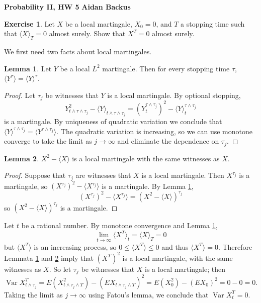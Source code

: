 \documentclass[10pt]{article}
\DeclareMathOperator{\Var}{Var}
\theoremstyle{definition}
\newtheorem{exer}{Exercise}
\newtheorem{lemma}{Lemma}[exer]
\begin{document}
\noindent
\large\textbf{Probability II, HW 5} \hfill \textbf{Aidan Backus} \\

\begin{exer}
Let $X$ be a local martingale, $X_0 = 0$, and $T$ a stopping time such that $\langle X\rangle_T = 0$ almost surely.
Show that $X^T = 0$ almost surely.
\end{exer}

We first need two facts about local martingales.

\begin{lemma}
\label{stopping time of quadratic variation}
Let $Y$ be a local $L^2$ martingale. Then for every stopping time $\tau$, $\langle Y^\tau \rangle = \langle Y \rangle^\tau$.
\end{lemma}
\begin{proof}
Let $\tau_j$ be witnesses that $Y$ is a local martingale.
By optional stopping,
$$Y^2_{t \wedge \tau \wedge \tau_j} - \langle Y\rangle_{t \wedge \tau \wedge \tau_j} = (Y^{\tau \wedge \tau_j}_t)^2 - \langle Y\rangle_t^{\tau \wedge \tau_j}$$
is a martingale. By uniqueness of quadratic variation we conclude that $\langle Y\rangle^{\tau \wedge \tau_j} = \langle Y^{\tau \wedge \tau_j}\rangle$.
The quadratic variation is increasing, so we can use monotone converge to take the limit as $j \to \infty$ and eliminate the dependence on $\tau_j$.
\end{proof}

\begin{lemma}
\label{local quadratic variation}
$X^2 - \langle X\rangle$ is a local martingale with the same witnesses as $X$.
\end{lemma}
\begin{proof}
Suppose that $\tau_j$ are witnesses that $X$ is a local martingale.
Then $X^{\tau_j}$ is a martingale, so $(X^{\tau_j})^2 - \langle X^{\tau_j}\rangle$ is a martingale.
By Lemma \ref{stopping time of quadratic variation},
$$(X^{\tau_j})^2 - \langle X^{\tau_j} \rangle = (X^2 - \langle X\rangle)^{\tau_j}$$
so $(X^2 - \langle X\rangle)^{\tau_j}$ is a martingale.
\end{proof}

Let $t$ be a rational number.
By monotone convergence and Lemma \ref{stopping time of quadratic variation},
$$\lim_{t \to \infty} \langle X^T \rangle_t = \langle X \rangle_T = 0$$
but $\langle X^T\rangle$ is an increasing process, so $0 \leq \langle X^T\rangle \leq 0$ and thus $\langle X^T \rangle = 0$.
Therefore Lemmata \ref{stopping time of quadratic variation} and \ref{local quadratic variation} imply that $(X^T)^2$ is a local martingale, with the same witnesses as $X$.
So let $\tau_j$ be witnesses that $X$ is a local martingale; then
$$\Var X_{t \wedge \tau_j}^T = E(X_{t \wedge \tau_j \wedge T}^2) - (EX_{t \wedge \tau_j \wedge T})^2 = E(X_0^2) - (EX_0)^2 = 0 - 0 = 0.$$
Taking the limit as $j \to \infty$ using Fatou's lemma, we conclude that $\Var X_t^T = 0$.
\end{document}
